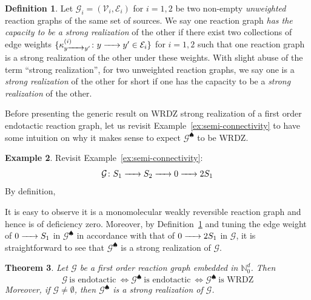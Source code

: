 \documentclass[10pt]{amsart}
\numberwithin{equation}{section}
\theoremstyle{plain}
\newtheorem{theorem}{Theorem}[section]
\theoremstyle{definition}
\newtheorem{definition}[theorem]{Definition}
\newtheorem{example}[theorem]{Example}
\theoremstyle{remark}
\newcommand{\cE}{\mathcal{E}}
\newcommand{\cG}{\mathcal{G}}
\newcommand{\cV}{\mathcal{V}}
\begin{document}
\begin{definition}\label{def:unweighted-graph-equivalence}
Let $\cG_i=(\cV_i,\cE_i)$ for $i=1,2$ be two non-empty  \emph{unweighted}  reaction graphs of the same set of sources. We say
one reaction graph \emph{has the capacity to be a strong realization} of the other if there exist two collections of edge weights $\{\kappa_{y\ce{->}y'}^{(i)}\colon y\ce{->}y'\in\cE_i\}$ for $i=1,2$ such that one reaction graph is a strong realization of the other under these weights. With slight abuse of the term ``strong realization'', for two unweighted reaction graphs,
we say one is a \emph{strong realization} of the other for short if one has the capacity to be a \emph{strong realization} of the other.
\end{definition}

Before presenting the generic result on WRDZ strong realization of a first order endotactic reaction graph, let us revisit Example~\ref{ex:semi-connectivity} to have some intuition on why it makes sense to expect $\cG^{\spadesuit}$ to be WRDZ.
\begin{example}
Revisit Example~\ref{ex:semi-connectivity}:
\[\cG\colon S_1\ce{->}S_2\ce{->}0\ce{->}2S_1\]
By definition, 
\begin{center}
\end{center}
It is easy to observe it is a monomolecular weakly reversible reaction graph and hence is of deficiency zero. Moreover, by Definition~\ref{def:unweighted-graph-equivalence} and tuning the edge weight of $0\ce{->}S_1$ in $\cG^{\spadesuit}$ in accordance with that of $0\ce{->} 2S_1$ in $\cG$, it is straightforward to see that $\cG^{\spadesuit}$ is a strong realization of $\cG$.
\end{example}
\begin{theorem}\label{thm:endotactic=weakly-reversible}
Let $\cG$ be a  first order reaction graph embedded in $\mathbb{N}^d_0$. Then
\[\cG\ \text{is endotactic}\ \Leftrightarrow \cG^{\spadesuit}\ \text{is endotactic}\ \Leftrightarrow \cG^{\spadesuit}\ \text{is WRDZ}\]
Moreover, if $\cG\neq\emptyset$, then $\cG^{\spadesuit}$ is a strong realization of $\cG$.
\end{theorem}
\end{document}
